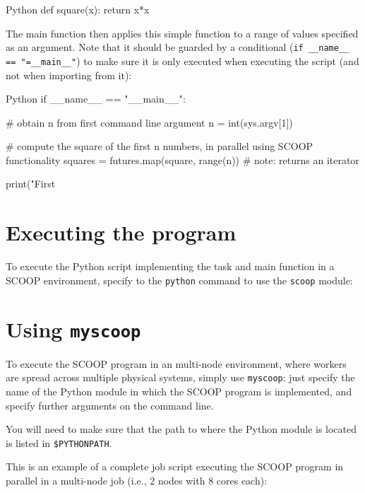 \begin{code}{Python}
def square(x):
    return x*x
\end{code}

The main function then applies this simple function to a range of values specified as an argument.
Note that it should be guarded by a conditional (\lstinline|if __name__ == "=__main__"|) to make sure it is only executed
when executing the script (and not when importing from it):

\begin{code}{Python}
if __name__ == "__main__":

    # obtain n from first command line argument
    n = int(sys.argv[1])

    # compute the square of the first n numbers, in parallel using SCOOP functionality
    squares = futures.map(square, range(n))  # note: returns an iterator

    print("First %
\end{code}

\section{Executing the program}

To execute the Python script implementing the task and main function in a SCOOP environment,
specify to the \lstinline|python| command to use the \lstinline|scoop| module:

\begin{prompt}
\end{prompt}


\section{Using \texttt{myscoop}}

To execute the SCOOP program in an multi-node environment, where workers are spread
across multiple physical systems, simply use \lstinline|myscoop|: just specify the
name of the Python module in which the SCOOP program is implemented, and specify
further arguments on the command line.

You will need to make sure that the path to where the Python module is located is listed in \lstinline|$PYTHONPATH|.

This is an example of a complete job script executing the SCOOP program in parallel
in a multi-node job (i.e., 2 nodes with 8 cores each):

